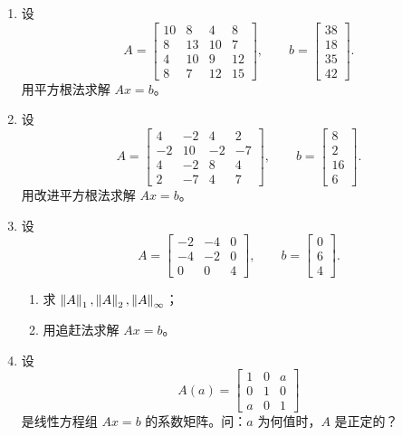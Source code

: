 \documentclass{article}
\begin{document}
\begin{enumerate}
  \item 设
  \[
    A=\begin{bmatrix}
      10&8&4&8\\
      8&13&10&7\\
      4&10&9&12\\
      8&7&12&15
    \end{bmatrix},\qquad
    b=\begin{bmatrix}38\\18\\35\\42\end{bmatrix}.
  \]
  用平方根法求解 $Ax=b$。

  \item 设
  \[
    A=\begin{bmatrix}
      4&-2&4&2\\
      -2&10&-2&-7\\
      4&-2&8&4\\
      2&-7&4&7
    \end{bmatrix},\qquad
    b=\begin{bmatrix}8\\2\\16\\6\end{bmatrix}.
  \]
  用改进平方根法求解 $Ax=b$。

  \item 设
  \[
    A=\begin{bmatrix}-2&-4&0\\-4&-2&0\\0&0&4\end{bmatrix},\qquad
    b=\begin{bmatrix}0\\6\\4\end{bmatrix}.
  \]
  \begin{enumerate}[(1)]
    \item 求 $\left\| A \right\|_1,\left\| A \right\|_2,\left\| A \right\|_\infty$；
    \item 用追赶法求解 $Ax=b$。
  \end{enumerate}

  \item 设
  \[
    A(a)=\begin{bmatrix}1&0&a\\0&1&0\\a&0&1\end{bmatrix}
  \]
  是线性方程组 $Ax=b$ 的系数矩阵。问：$a$ 为何值时，$A$ 是正定的？
\end{enumerate}
\end{document}
